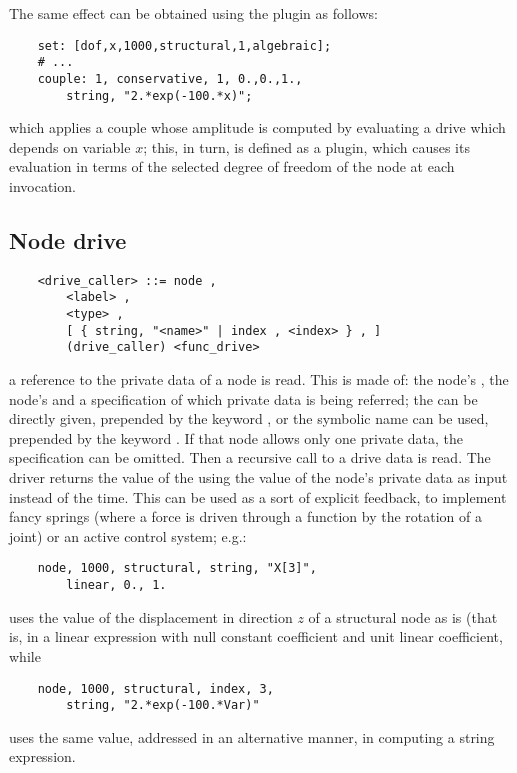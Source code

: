 \noindent
The same effect can be obtained using the  plugin as follows:
\begin{verbatim}
    set: [dof,x,1000,structural,1,algebraic];
    # ...
    couple: 1, conservative, 1, 0.,0.,1.,
        string, "2.*exp(-100.*x)";
\end{verbatim}
which applies a couple whose amplitude is computed by evaluating
a  drive which depends on variable $x$; this, in turn,
is defined as a  plugin, which causes its evaluation
in terms of the selected degree of freedom of the node at each invocation.

\subsection{Node drive}\label{sec:DRIVE-NODE}
\begin{verbatim}
    <drive_caller> ::= node ,
        <label> ,
        <type> ,
        [ { string, "<name>" | index , <index> } , ]
        (drive_caller) <func_drive>
\end{verbatim}
a reference to the private data of a node is read.
This is made of: the node's , the node's 
and a specification of which private data is being referred;
the  can be directly given, prepended by the keyword
, or the symbolic name can be used, prepended by 
the keyword .
If that node allows only one private data, the specification 
can be omitted.
Then a recursive call to a drive data is read. 
The driver returns the value of the  
 using the value of the 
node's private data as input instead of the time. 
This can be used as a sort of explicit feedback, to implement fancy
springs (where a force is driven through a function by the rotation
of a joint) or an active control system; e.g.:
\begin{verbatim}
    node, 1000, structural, string, "X[3]",
        linear, 0., 1.
\end{verbatim}
uses the value of the displacement in direction $z$ of a structural node
as is (that is, in a linear expression with null constant coefficient 
and unit linear coefficient, while
\begin{verbatim}
    node, 1000, structural, index, 3,
        string, "2.*exp(-100.*Var)"
\end{verbatim}
uses the same value, addressed in an alternative manner, in computing
a string expression.


